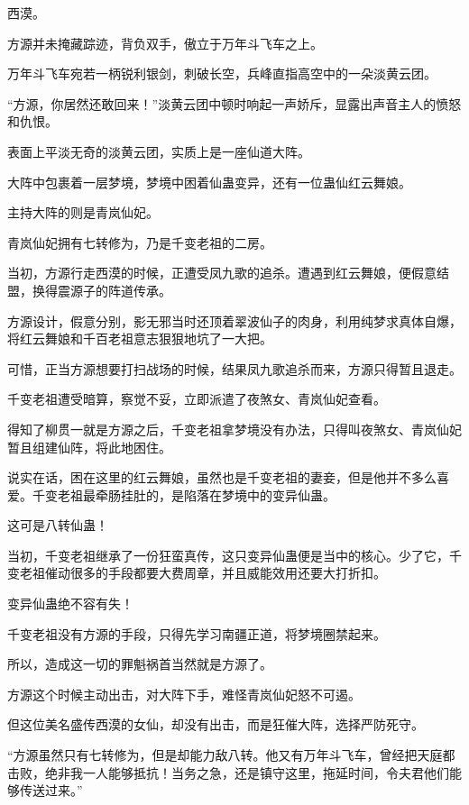 
\begin{this_body}

西漠。

方源并未掩藏踪迹，背负双手，傲立于万年斗飞车之上。

万年斗飞车宛若一柄锐利银剑，刺破长空，兵峰直指高空中的一朵淡黄云团。

“方源，你居然还敢回来！”淡黄云团中顿时响起一声娇斥，显露出声音主人的愤怒和仇恨。

表面上平淡无奇的淡黄云团，实质上是一座仙道大阵。

大阵中包裹着一层梦境，梦境中困着仙蛊变异，还有一位蛊仙红云舞娘。

主持大阵的则是青岚仙妃。

青岚仙妃拥有七转修为，乃是千变老祖的二房。

当初，方源行走西漠的时候，正遭受凤九歌的追杀。遭遇到红云舞娘，便假意结盟，换得震源子的阵道传承。

方源设计，假意分别，影无邪当时还顶着翠波仙子的肉身，利用纯梦求真体自爆，将红云舞娘和千百老祖意志狠狠地坑了一大把。

可惜，正当方源想要打扫战场的时候，结果凤九歌追杀而来，方源只得暂且退走。

千变老祖遭受暗算，察觉不妥，立即派遣了夜煞女、青岚仙妃查看。

得知了柳贯一就是方源之后，千变老祖拿梦境没有办法，只得叫夜煞女、青岚仙妃暂且组建仙阵，将此地困住。

说实在话，困在这里的红云舞娘，虽然也是千变老祖的妻妾，但是他并不多么喜爱。千变老祖最牵肠挂肚的，是陷落在梦境中的变异仙蛊。

这可是八转仙蛊！

当初，千变老祖继承了一份狂蛮真传，这只变异仙蛊便是当中的核心。少了它，千变老祖催动很多的手段都要大费周章，并且威能效用还要大打折扣。

变异仙蛊绝不容有失！

千变老祖没有方源的手段，只得先学习南疆正道，将梦境圈禁起来。

所以，造成这一切的罪魁祸首当然就是方源了。

方源这个时候主动出击，对大阵下手，难怪青岚仙妃怒不可遏。

但这位美名盛传西漠的女仙，却没有出击，而是狂催大阵，选择严防死守。

“方源虽然只有七转修为，但是却能力敌八转。他又有万年斗飞车，曾经把天庭都击败，绝非我一人能够抵抗！当务之急，还是镇守这里，拖延时间，令夫君他们能够传送过来。”


\end{this_body}
